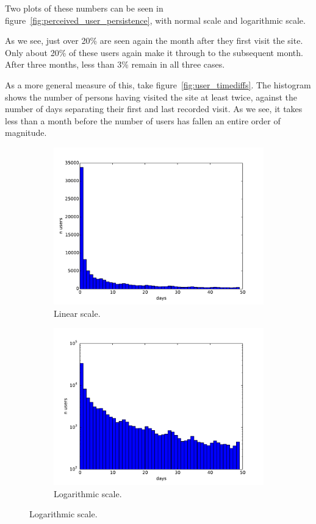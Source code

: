 Two plots of these numbers can be seen in figure~\ref{fig:perceived_user_persistence}, with normal scale and logarithmic scale.

As we see, just over 20\% are seen again the month after they first visit the site. Only about 20\% of these users again make it through to the subsequent month. After three months, less than 3\% remain in all three cases.

As a more general measure of this, take figure~\ref{fig:user_timediffs}. The histogram shows the number of persons having visited the site at least twice, against the number of days separating their first and last recorded visit. As we see, it takes less than a month before the number of users has fallen an entire order of magnitude.

\begin{figure}[t]
  \centering
  \begin{subfigure}[t]{0.9\textwidth}
    \includegraphics[width=\textwidth]{Figures/plots/timediffs/timediffs}
    \caption{Linear scale.}
  \end{subfigure}

  \begin{subfigure}[t]{0.9\textwidth}
    \includegraphics[width=\textwidth]{Figures/plots/timediffs/timediffs-log}
    \caption{Logarithmic scale.}
  \end{subfigure}


\end{figure}
